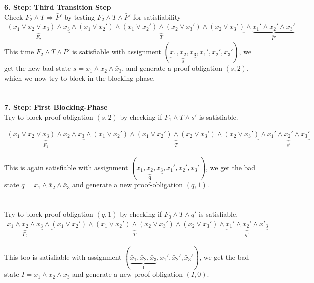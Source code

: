 \documentclass[11pt, a4paper, BCOR=10mm, ngerman, oneside]{scrbook}
\begin{document}
\textbf{6. Step: Third Transition Step} \\ Check $F_2 \land T \Rightarrow \bar P'$ by testing $F_2 \land T \land \bar P'$ for satisfiability \\
\begin{align*}
\underbrace{(\bar x_1 \lor \bar x_2 \lor \bar x_3) \land \bar x_3}_{F_2} \land \underbrace{(x_1 \lor \bar x_2' ) \land ( \bar x_1 \lor x_2') \land (x_2 \lor \bar x_3') \land ( \bar x_2 \lor x_3')}_{T} \land \underbrace{x_1' \land x_2' \land x_3'}_{ \bar P'}
\end{align*}
This time $F_2 \land T \land \bar P'$ is satisfiable with assignment $( \underbrace{x_1, x_2, \bar x_3}_{s}, x_1', x_2', x_3')$, we get the new bad state $s = x_1 \land x_2 \land \bar x_3$, and generate a proof-obligation $(s, 2)$, which we now try to block in the blocking-phase. \\ \\ \\

\textbf{7. Step: First Blocking-Phase} \\ Try to block proof-obligation $(s, 2)$ by checking if $F_1 \land T \land s'$ is satisfiable. \label{ex2}

\begin{align*}
\underbrace{(\bar x_1 \lor \bar x_2 \lor \bar x_3) \land \bar x_2 \land \bar x_3}_{F_1} \land \underbrace{(x_1 \lor \bar x_2' ) \land ( \bar x_1 \lor x_2') \land (x_2 \lor \bar x_3') \land ( \bar x_2 \lor x_3')}_{T} \land \underbrace{x_1' \land x_2' \land \bar x_3'}_{ s'}
\end{align*}

This is again satisfiable with assignment $(\underbrace{x_1, \bar x_2, \bar x_3}_{\text{q}}, x_1', x_2', \bar x_3')$, we get the bad state $q = x_1 \land \bar x_2 \land \bar x_3$ and generate a new proof-obligation $(q, 1)$. \\ \\ \\

Try to block proof-obligation $(q, 1)$ by checking if $F_0 \land T \land q'$ is satisfiable.
\begin{align*}
\underbrace{\bar x_1 \land \bar x_2 \land \bar x_3}_{F_0} \land \underbrace{(x_1 \lor \bar x_2' ) \land ( \bar x_1 \lor x_2') \land (x_2 \lor \bar x_3') \land ( \bar x_2 \lor x_3')}_{T} \land \underbrace{x_1' \land \bar x_2' \land \bar x'_3}_{ q'}
\end{align*}

This too is satisfiable with assignment $(\underbrace{\bar x_1, \bar x_2, \bar x_3}_{\text{I}}, x_1', \bar x_2', \bar x_3')$, we get the bad state $I = x_1 \land \bar x_2 \land \bar x_3$ and generate a new proof-obligation $(I, 0)$.
\end{document}
